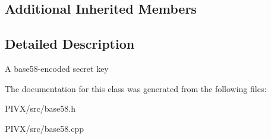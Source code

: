 \subsection*{Additional Inherited Members}


\subsection{Detailed Description}
A base58-\/encoded secret key 

The documentation for this class was generated from the following files\+:\begin{DoxyCompactItemize}
\item 
P\+I\+V\+X/src/base58.\+h\item 
P\+I\+V\+X/src/base58.\+cpp\end{DoxyCompactItemize}
